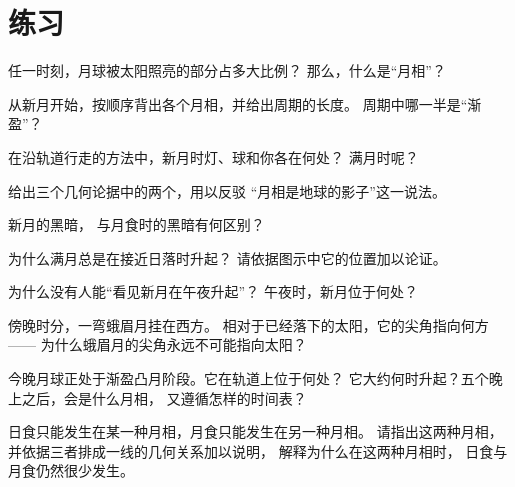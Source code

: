 \section{练习}

\begin{exercise}[$\star$]\label{exo:g7:moon-phases:1}
任一时刻，月球被太阳照亮的部分占多大比例？
那么，什么是“月相”？
\end{exercise}

\begin{exercise}[$\star$]\label{exo:g7:moon-phases:2}
从新月开始，按顺序背出各个月相，并给出周期的长度。
周期中哪一半是“渐盈”？
\end{exercise}

\begin{exercise}[$\star$]\label{exo:g7:moon-phases:3}
在沿轨道行走的方法中，新月时灯、球和你各在何处？
满月时呢？
\end{exercise}

\begin{exercise}[$\star$]\label{exo:g7:moon-phases:4}
给出三个几何论据中的两个，用以反驳
“月相是地球的影子”这一说法。
\end{exercise}

\begin{exercise}[$\star$]\label{exo:g7:moon-phases:5}
新月的黑暗，
与月食时的黑暗有何区别？
\end{exercise}

\begin{exercise}[$\star$]\label{exo:g7:moon-phases:6}
为什么满月总是在接近日落时升起？
请依据图示中它的位置加以论证。
\end{exercise}

\begin{exercise}[$\star$]\label{exo:g7:moon-phases:7}
为什么没有人能“看见新月在午夜升起”？
午夜时，新月位于何处？
\end{exercise}

\begin{exercise}[$\star$]\label{exo:g7:moon-phases:8}
傍晚时分，一弯蛾眉月挂在西方。
相对于已经落下的太阳，它的尖角指向何方——
为什么蛾眉月的尖角永远不可能指向太阳？
\end{exercise}

\begin{exercise}[$\star\star$]\label{exo:g7:moon-phases:9}
今晚月球正处于渐盈凸月阶段。它在轨道上位于何处？
它大约何时升起？五个晚上之后，会是什么月相，
又遵循怎样的时间表？
\end{exercise}

\begin{exercise}[$\star\star$]\label{exo:g7:moon-phases:10}
日食只能发生在某一种月相，月食只能发生在另一种月相。
请指出这两种月相，并依据三者排成一线的几何关系加以说明，
解释为什么在这两种月相时，
日食与月食仍然很少发生。
\end{exercise}


